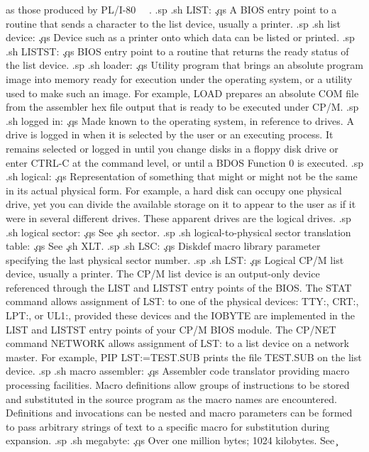 as those produced by PL/I-80 \ \ .
.sp
.sh
LIST:  \c
.qs
A BIOS entry point to a routine that sends a character to the 
list device, usually a printer.
.sp
.sh
list device:  \c
.qs
Device such as a printer onto which data can be listed or 
printed.
.sp
.sh
LISTST:  \c
.qs
BIOS entry point to a routine that returns the ready status of 
the list device.
.sp
.sh
loader:  \c
.qs
Utility program that brings an absolute program image into memory 
ready for execution under the operating system, or a utility used 
to make such an image.  For example, LOAD prepares an absolute 
COM file from the assembler hex file output that is ready to be 
executed under CP/M.
.sp
.sh
logged in:  \c
.qs
Made known to the operating system, in reference to drives.  A 
drive is logged in when it is selected by the user or an 
executing process.  It remains selected or logged in until you 
change disks in a floppy disk drive or enter CTRL-C at the 
command level, or until a BDOS Function 0 is executed.
.sp
.sh
logical:  \c
.qs
Representation of something that might or might not be the same 
in its actual physical form.  For example, a hard disk can occupy 
one physical drive, yet you can divide the available storage on 
it to appear to the user as if it were in several different 
drives.  These apparent drives are the logical drives.
.sp
.sh
logical sector:  \c
.qs
See \c
.sh
sector.
.sp
.sh
logical-to-physical sector translation table:  \c
.qs
See \c
.sh
XLT.
.sp
.sh
LSC:  \c
.qs
Diskdef macro library parameter specifying the last physical 
sector number.
.sp
.sh
LST:  \c
.qs
Logical CP/M list device, usually a printer.  The CP/M list 
device is an output-only device referenced through the LIST and 
LISTST entry points of the BIOS.  The STAT command allows 
assignment of LST: to one of the physical devices:  TTY:, CRT:, 
LPT:, or UL1:, provided these devices and the IOBYTE are 
implemented in the LIST and LISTST entry points of your CP/M BIOS 
module.  The CP/NET command NETWORK allows assignment of LST: to 
a list device on a network master.  For example, PIP LST:=TEST.SUB
prints the file TEST.SUB on the list device.
.sp
.sh
macro assembler:  \c
.qs
Assembler code translator providing macro processing facilities.  
Macro definitions allow groups of instructions to be stored and 
substituted in the source program as the macro names are 
encountered.  Definitions and invocations can be nested and macro 
parameters can be formed to pass arbitrary strings of text to a 
specific macro for substitution during expansion.
.sp
.sh
megabyte:  \c
.qs
Over one million bytes; 1024 kilobytes.  See \c
